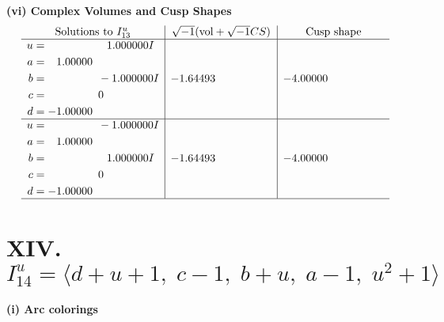 \documentclass[1p]{elsarticle_modified}
\theoremstyle{definition}
\newcommand{\I}{\sqrt{-1}}
\begin{document}
\newpage\flushleft \textbf{(vi) Complex Volumes and Cusp Shapes}
$$\begin{array}{c|c|c}  
\text{Solutions to }I^u_{13}& \I (\text{vol} + \sqrt{-1}CS) & \text{Cusp shape}\\
 \hline 
\begin{aligned}
u &= \phantom{-0.000000 -}1.000000 I \\
a &= \phantom{-}1.00000\phantom{ +0.000000I} \\
b &= \phantom{-0.000000 } -1.000000 I \\
c &= \phantom{-0.000000 } 0 \\
d &= -1.00000\phantom{ +0.000000I}\end{aligned}
 & -1.64493\phantom{ +0.000000I} & -4.00000\phantom{ +0.000000I} \\ \hline\begin{aligned}
u &= \phantom{-0.000000 } -1.000000 I \\
a &= \phantom{-}1.00000\phantom{ +0.000000I} \\
b &= \phantom{-0.000000 -}1.000000 I \\
c &= \phantom{-0.000000 } 0 \\
d &= -1.00000\phantom{ +0.000000I}\end{aligned}
 & -1.64493\phantom{ +0.000000I} & -4.00000\phantom{ +0.000000I}\\
 \hline 
 \end{array}$$\newpage\newpage\renewcommand{\arraystretch}{1}
\centering \section*{XIV. $I^u_{14}= \langle d+u+1,\;c-1,\;b+u,\;a-1,\;u^2+1 \rangle$}
\flushleft \textbf{(i) Arc colorings}\\
\end{document}
